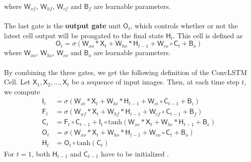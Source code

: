 \documentclass[./main.tex]{subfiles}
\begin{document}
where $\mathsf{W}_{xf}$, $\mathsf{W}_{hf}$, $\mathsf{W}_{cf}$ and $\mathsf{B}_f$ are learnable parameters.
\\
\\
The last gate is the \textbf{output gate} unit $\mathsf{O}_t$, which controls whether or not the latest cell output will be proagated to the final state $\mathsf{H}_t$. This cell is defined as
\begin{equation}
    \mathsf{O}_t = \sigma \left( \mathsf{W}_{xo} * \mathsf{X}_t + \mathsf{W}_{ho} * \mathsf{H}_{t - 1} + \mathsf{W}_{co} \circ \mathsf{C}_t + \mathsf{B}_o \right)
\end{equation}
where $\mathsf{W}_{xo}$, $\mathsf{W}_{ho}$, $\mathsf{W}_{co}$ and $\mathsf{B}_o$ are learnable parameters.
\\
\\
By combining the three gates, we get the following definition of the ConvLSTM Cell.
Let $\mathsf{X}_1, \mathsf{X}_2, ..., \mathsf{X}_t$ be a sequence of input images. Then, at each time step $t$, we compute
\begin{align}
    \mathsf{I}_t &= \sigma \left( \mathsf{W}_{xi} * \mathsf{X}_t + \mathsf{W}_{hi} * \mathsf{H}_{t - 1} + \mathsf{W}_{ci} \circ \mathsf{C}_{t - 1} + \mathsf{B}_i \right) \\
    \mathsf{F}_t &= \sigma \left( \mathsf{W}_{xf} * \mathsf{X}_t + \mathsf{W}_{hf} * \mathsf{H}_{t - 1} + \mathsf{W}_{cf} \circ \mathsf{C}_{t - 1} + \mathsf{B}_f \right) \\
    \mathsf{C}_t &= \mathsf{F}_t \circ \mathsf{C}_{t - 1} + \mathsf{I}_t \circ \text{tanh} \left( \mathsf{W}_{xc} * \mathsf{X}_t + \mathsf{W}_{hc} * \mathsf{H}_{t - 1} + \mathsf{B}_c \right) \\
    \mathsf{O}_t &= \sigma \left( \mathsf{W}_{xo} * \mathsf{X}_t + \mathsf{W}_{ho} * \mathsf{H}_{t - 1} + \mathsf{W}_{co} \circ \mathsf{C}_t + \mathsf{B}_o \right) \\
    \mathsf{H}_t &= \mathsf{O}_t \circ \text{tanh}(\mathsf{C}_t)
\end{align}
For $t = 1$, both $\mathsf{H}_{t - 1}$ and $\mathsf{C}_{t - 1}$ have to be initialized \cite{conv_lstm}.
\end{document}
